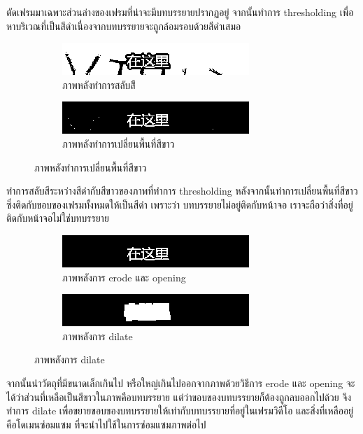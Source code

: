 \documentclass[hidelinks,a4paper,14pt]{article}
\numberwithin{equation}{section}							%
\begin{document}
{		ตัดเฟรมมาเฉพาะส่วนล่างของเฟรมที่น่าจะมีบทบรรยายปรากฏอยู่ จากนั้นทำการ thresholding เพื่อหาบริเวณที่เป็นสีดำเนื่องจากบทบรรยายจะถูกล้อมรอบด้วยสีดำเสมอ
		
		\begin{figure}[H]
			\begin{subfigure}{0.4\linewidth}
				\centering
				\includegraphics[width=0.4\linewidth]{images/detection-inverse.png}
				\caption{ภาพหลังทำการสลับสีี}
			\end{subfigure}
			\begin{subfigure}{0.4\linewidth}
				\centering
				\includegraphics[width=0.4\linewidth]{images/detection-blackfill.png}
				\caption{ภาพหลังทำการเปลี่ยนพื้นที่สีขาว}
			\end{subfigure}
		\end{figure}
		
		ทำการสลับสีระหว่างสีดำกับสีขาวของภาพที่ทำการ thresholding หลังจากนั้นทำการเปลี่ยนพื้นที่สีขาวซึ่งติดกับขอบของเฟรมทั้งหมดให้เป็นสีดำ เพราะว่า บทบรรยายไม่อยู่ติดกับหน้าจอ เราจะถือว่าสิ่งที่อยู่ติดกับหน้าจอไม่ใช่บทบรรยาย
		
		\begin{figure}[H]
			\begin{subfigure}{0.4\linewidth}
				\centering
				\includegraphics[width=0.4\linewidth]{images/detection-erode-opening.png}
				\caption{ภาพหลังการ erode และ opening}
			\end{subfigure}
			\begin{subfigure}{0.4\linewidth}
				\centering
				\includegraphics[width=0.4\linewidth]{images/detection-stoke.png}
				\caption{ภาพหลังการ dilate}
			\end{subfigure}
		\end{figure}
		
		จากนั้นนำวัตถุที่มีขนาดเล็กเกินไป หรือใหญ่เกินไปออกจากภาพด้วยวิธีการ erode และ opening
		จะได้ว่าส่วนที่เหลือเป็นสีขาวในภาพคือบทบรรยาย แต่ว่าขอบของบทบรรยายก็ต้องถูกลบออกไปด้วย จึงทำการ dilate เพื่อขยายขอบของบทบรรยายให้เท่ากับบทบรรยายที่อยู่ในเฟรมวิดีโอ และสิ่งที่เหลืออยู่คือโดเมนซ่อมแซม ที่จะนำไปใช้ในการซ่อมแซมภาพต่อไป
		
}
\end{document}
